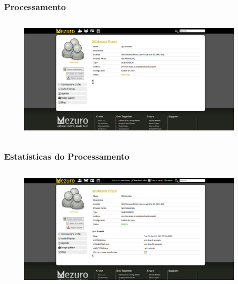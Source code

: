 \documentclass{beamer}
\begin{document}
    \begin{frame}
      \frametitle{Processamento}
      \framesubtitle{}
    
      \begin{figure}
        \begin{center}
          \includegraphics[width=11cm, height=6cm]{images/08-processing.png}
          \label{fig:processing}
        \end{center}
      \end{figure}
    \end{frame}
    
    \begin{frame}
      \frametitle{Estatísticas do Processamento}
      \framesubtitle{}
    
      \begin{figure}
        \begin{center}
          \includegraphics[width=11cm, height=6cm]{images/08-processing-stats.png}
          \label{fig:processing-stats}
        \end{center}
      \end{figure}
    \end{frame}
    
\end{document}
